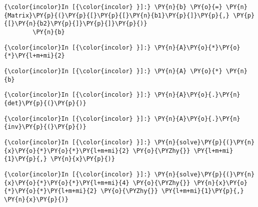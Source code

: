     \begin{Verbatim}[commandchars=\\\{\}]
{\color{incolor}In [{\color{incolor} }]:} \PY{n}{b} \PY{o}{=} \PY{n}{Matrix}\PY{p}{(}\PY{p}{[}\PY{p}{[}\PY{n}{b1}\PY{p}{]}\PY{p}{,} \PY{p}{[}\PY{n}{b2}\PY{p}{]}\PY{p}{]}\PY{p}{)}
        \PY{n}{b}
\end{Verbatim}



    \begin{Verbatim}[commandchars=\\\{\}]
{\color{incolor}In [{\color{incolor} }]:} \PY{n}{A}\PY{o}{*}\PY{o}{*}\PY{l+m+mi}{2}
\end{Verbatim}

    \begin{Verbatim}[commandchars=\\\{\}]
{\color{incolor}In [{\color{incolor} }]:} \PY{n}{A} \PY{o}{*} \PY{n}{b}
\end{Verbatim}



    \begin{Verbatim}[commandchars=\\\{\}]
{\color{incolor}In [{\color{incolor} }]:} \PY{n}{A}\PY{o}{.}\PY{n}{det}\PY{p}{(}\PY{p}{)}
\end{Verbatim}

    \begin{Verbatim}[commandchars=\\\{\}]
{\color{incolor}In [{\color{incolor} }]:} \PY{n}{A}\PY{o}{.}\PY{n}{inv}\PY{p}{(}\PY{p}{)}
\end{Verbatim}





    \begin{Verbatim}[commandchars=\\\{\}]
{\color{incolor}In [{\color{incolor} }]:} \PY{n}{solve}\PY{p}{(}\PY{n}{x}\PY{o}{*}\PY{o}{*}\PY{l+m+mi}{2} \PY{o}{\PYZhy{}} \PY{l+m+mi}{1}\PY{p}{,} \PY{n}{x}\PY{p}{)}
\end{Verbatim}

    \begin{Verbatim}[commandchars=\\\{\}]
{\color{incolor}In [{\color{incolor} }]:} \PY{n}{solve}\PY{p}{(}\PY{n}{x}\PY{o}{*}\PY{o}{*}\PY{l+m+mi}{4} \PY{o}{\PYZhy{}} \PY{n}{x}\PY{o}{*}\PY{o}{*}\PY{l+m+mi}{2} \PY{o}{\PYZhy{}} \PY{l+m+mi}{1}\PY{p}{,} \PY{n}{x}\PY{p}{)}
\end{Verbatim}



